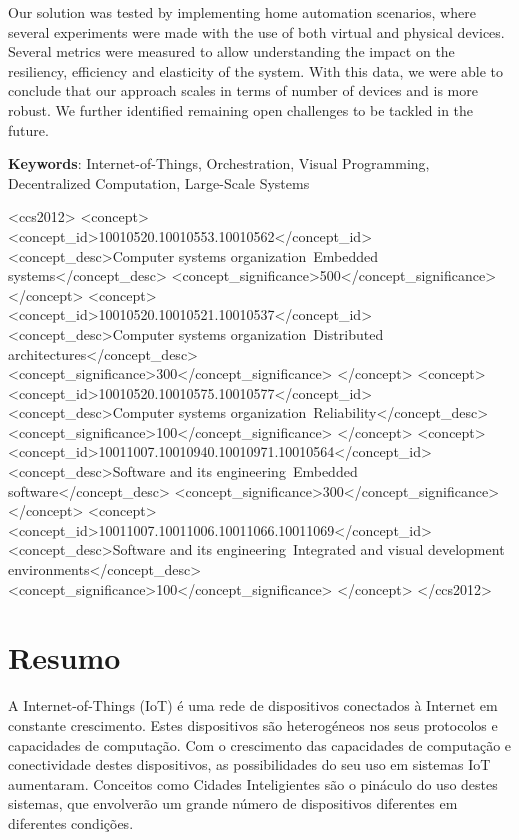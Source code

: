 Our solution was tested by implementing home automation scenarios, where several experiments were made with the use of both virtual and physical devices. Several metrics were measured to allow understanding the impact on the resiliency, efficiency and elasticity of the system. With this data, we were able to conclude that our approach scales in terms of number of devices and is more robust. We further identified remaining open challenges to be tackled in the future.

\vspace*{10mm}\noindent

\textbf{Keywords}: Internet-of-Things, Orchestration, Visual Programming, Decentralized Computation, Large-Scale Systems

\begin{CCSXML}
    <ccs2012>
       <concept>
           <concept_id>10010520.10010553.10010562</concept_id>
           <concept_desc>Computer systems organization~Embedded systems</concept_desc>
           <concept_significance>500</concept_significance>
           </concept>
       <concept>
           <concept_id>10010520.10010521.10010537</concept_id>
           <concept_desc>Computer systems organization~Distributed architectures</concept_desc>
           <concept_significance>300</concept_significance>
           </concept>
       <concept>
           <concept_id>10010520.10010575.10010577</concept_id>
           <concept_desc>Computer systems organization~Reliability</concept_desc>
           <concept_significance>100</concept_significance>
           </concept>
       <concept>
           <concept_id>10011007.10010940.10010971.10010564</concept_id>
           <concept_desc>Software and its engineering~Embedded software</concept_desc>
           <concept_significance>300</concept_significance>
           </concept>
       <concept>
           <concept_id>10011007.10011006.10011066.10011069</concept_id>
           <concept_desc>Software and its engineering~Integrated and visual development environments</concept_desc>
           <concept_significance>100</concept_significance>
           </concept>
     </ccs2012>
    \end{CCSXML}

\chapter*{Resumo}

A Internet-of-Things (IoT) é uma rede de dispositivos conectados à Internet em constante crescimento. Estes dispositivos são heterogéneos nos seus protocolos e capacidades de computação. Com o crescimento das capacidades de computação e conectividade destes dispositivos, as possibilidades do seu uso em sistemas IoT aumentaram. Conceitos como Cidades Inteligientes são o pináculo do uso destes sistemas, que envolverão um grande número de dispositivos diferentes em diferentes condições.

